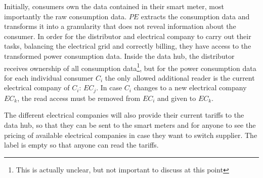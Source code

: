 Initially, consumers own the data contained in their smart meter, most importantly the raw consumption data.
$PE$ extracts the consumption data and transforms it into a granularity that does not reveal information about the consumer.
In order for the distributor and electrical company to carry out their tasks, balancing the electrical grid and correctly billing, they have access to the transformed power consumption data.
Inside the data hub, the distributor receives ownership of all consumption data\footnote{This is actually unclear, but not important to discuss at this point}, but for the power consumption data for each individual consumer $C_i$ the only allowed additional reader is the current electrical company of $C_i$: $EC_j$.
In case $C_i$ changes to a new electrical company $EC_k$, the read access must be removed from $EC_i$ and given to $EC_k$.

The different electrical companies will also provide their current tariffs to the data hub, so that they can be sent to the smart meters and for anyone to see the pricing of available electrical companies in case they want to switch supplier.
The label is empty so that anyone can read the tariffs.
